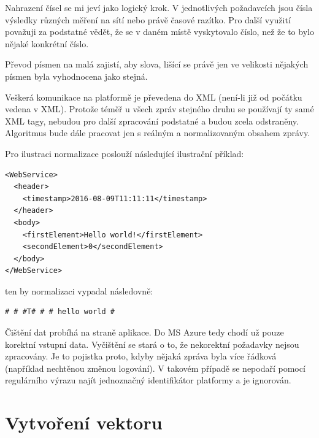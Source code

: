 \documentclass[thesis=M,czech]{FITthesis}[2012/10/20]
\begin{document}
		Nahrazení čísel se mi jeví jako logický krok. V jednotlivých požadavcích jsou čísla výsledky různých měření na sítí nebo právě časové razítko. Pro další využití považuji za podstatné vědět, že se v daném místě vyskytovalo číslo, než že to bylo nějaké konkrétní číslo.
		
		Převod písmen na malá zajistí, aby slova, lišící se právě jen ve velikosti nějakých písmen byla vyhodnocena jako stejná.
		
		Veškerá komunikace na platformě je převedena do XML (není-li již od počátku vedena v XML). Protože téměř u všech zpráv stejného druhu se používají ty samé XML tagy, nebudou pro další zpracování podstatné a budou zcela odstraněny. Algoritmus bude dále pracovat jen s reálným a normalizovaným obsahem zprávy. 
		
	 	Pro ilustraci normalizace poslouží následující ilustrační příklad:
	 	
	 	\begin{minipage}{\linewidth}
	 		\begin{lstlisting}[caption={Ilustrační příklad XML požadavku}, label={lst:xml-example}]
<WebService>
  <header>
    <timestamp>2016-08-09T11:11:11</timestamp>
  </header>
  <body>
    <firstElement>Hello world!</firstElement>
    <secondElement>0</secondElement>
  </body>
</WebService>
	 		\end{lstlisting}
	 	\end{minipage}
			
			ten by normalizaci vypadal následovně:
			
			\begin{minipage}{\linewidth}
				\begin{lstlisting}[caption={Ilustrační příklad po normalizaci}, label={lst:xml-example-normalized}]
# # #T# # # hello world #
				\end{lstlisting}
			\end{minipage}
		
		Čištění dat probíhá na straně aplikace. Do MS Azure tedy chodí už pouze korektní vstupní data. Vyčištění se stará o to, že nekorektní požadavky nejsou zpracovány. Je to pojistka proto, kdyby nějaká zpráva byla více řádková (například nechtěnou změnou logování). V takovém případě se nepodaří pomocí regulárního výrazu najít jednoznačný identifikátor platformy a  je ignorován.
			
	\section{Vytvoření vektoru}
		\label{sec:construct_vector}
		
\end{document}

